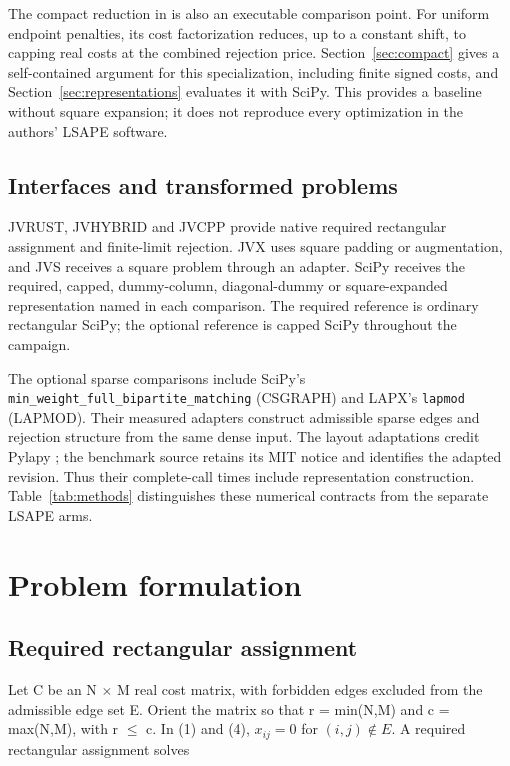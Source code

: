 \documentclass[11pt,a4paper]{article}
\begin{document}
The compact reduction in \cite{bougleux2020} is also an executable comparison point. For uniform endpoint penalties, its cost factorization reduces, up to a constant shift, to capping real costs at the combined rejection price. Section~\ref{sec:compact} gives a self-contained argument for this specialization, including finite signed costs, and Section~\ref{sec:representations} evaluates it with SciPy. This provides a baseline without square expansion; it does not reproduce every optimization in the authors' LSAPE software.

\subsection{Interfaces and transformed problems}

JVRUST, JVHYBRID and JVCPP provide native required rectangular assignment and finite-limit rejection. JVX uses square padding or augmentation, and JVS receives a square problem through an adapter. SciPy receives the required, capped, dummy-column, diagonal-dummy or square-expanded representation named in each comparison. The required reference is ordinary rectangular SciPy; the optional reference is capped SciPy throughout the campaign.

The optional sparse comparisons include SciPy's \texttt{min\_weight\_full\_bipartite\_matching} (CSGRAPH) \cite{scipycsgraph} and LAPX's \texttt{lapmod} (LAPMOD). Their measured adapters construct admissible sparse edges and rejection structure from the same dense input. The layout adaptations credit Pylapy \cite{pylapy2026}; the benchmark source retains its MIT notice and identifies the adapted revision. Thus their complete-call times include representation construction. Table~\ref{tab:methods} distinguishes these numerical contracts from the separate LSAPE arms.

\FloatBarrier
\section{Problem formulation}\label{sec:formulation}

\subsection{Required rectangular assignment}

Let C be an N \ensuremath{\times} M real cost matrix, with forbidden edges excluded from the admissible edge set E. Orient the matrix so that r = min(N,M) and c = max(N,M), with r \ensuremath{\leq} c. In (1) and (4), \(x_{ij}=0\) for \((i,j)\notin E\). A required rectangular assignment solves
\end{document}
